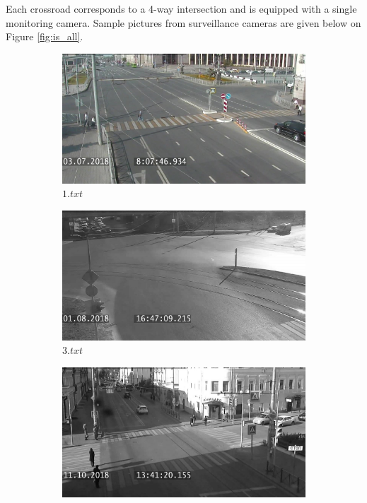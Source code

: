 Each crossroad corresponds to a 4-way intersection and is equipped with a single monitoring camera. Sample pictures from surveillance cameras are given below on Figure \ref{fig:is_all}.

\begin{figure}[!htb]
	\centering
	\begin{subfigure}[!htb]{0.48\textwidth}
		\centering{}
		\includegraphics[width=\textwidth]{images/is-1.jpg}
		\caption{$1.txt$}
		\label{fig:is_1}
	\end{subfigure}
	\hfill
	\begin{subfigure}[!htb]{0.48\textwidth}
		\centering{}
		\includegraphics[width=\textwidth]{images/is-2.jpg}
		\caption{$3.txt$}
		\label{fig:is_2}
	\end{subfigure}
	\hfill
	\begin{subfigure}[!htb]{0.48\textwidth}
		\centering{}
		\includegraphics[width=\textwidth]{images/is-3.jpg}

\end{subfigure}
\end{figure}
